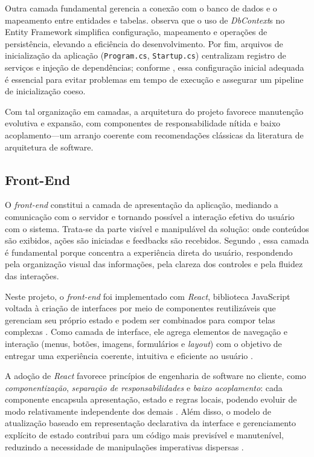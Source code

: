 Outra camada fundamental gerencia a conexão com o banco de dados e o mapeamento entre
entidades e tabelas. \textcite{Lerman2019} observa que o uso de \textit{DbContext}s no
Entity Framework simplifica configuração, mapeamento e operações de persistência, elevando
a eficiência do desenvolvimento. Por fim, arquivos de inicialização da aplicação
(\texttt{Program.cs}, \texttt{Startup.cs}) centralizam registro de serviços e injeção de
dependências; conforme \textcite{Proise2021}, essa configuração inicial adequada é
essencial para evitar problemas em tempo de execução e assegurar um pipeline de
inicialização coeso.

Com tal organização em camadas, a arquitetura do projeto favorece manutenção evolutiva e
expansão, com componentes de responsabilidade nítida e baixo acoplamento—um arranjo
coerente com recomendações clássicas da literatura de arquitetura de software.

\subsection{Front-End}

O \textit{front-end} constitui a camada de apresentação da aplicação, mediando a
comunicação com o servidor e tornando possível a interação efetiva do usuário com o
sistema. Trata-se da parte visível e manipulável da solução: onde conteúdos são
exibidos, ações são iniciadas e feedbacks são recebidos. Segundo \textcite{Meloni2018HTMLCSSJS4e},
essa camada é fundamental porque concentra a experiência direta do usuário, respondendo
pela organização visual das informações, pela clareza dos controles e pela fluidez das
interações.

Neste projeto, o \textit{front-end} foi implementado com \textit{React}, biblioteca
JavaScript voltada à criação de interfaces por meio de componentes reutilizáveis que
gerenciam seu próprio estado e podem ser combinados para compor telas complexas
\parencite{ReactLegacyPTBR2024}. Como camada de interface, ele agrega elementos
de navegação e interação (menus, botões, imagens, formulários e \textit{layout}) com o
objetivo de entregar uma experiência coerente, intuitiva e eficiente ao usuário
\parencite{TOTVS2021}.

A adoção de \textit{React} favorece princípios de engenharia de software no cliente,
como \emph{componentização}, \emph{separação de responsabilidades} e \emph{baixo
	acoplamento}: cada componente encapsula apresentação, estado e regras locais, podendo
evoluir de modo relativamente independente dos demais \parencite{ReactLegacyPTBR2024}.
Além disso, o modelo de atualização baseado em representação declarativa da interface
e gerenciamento explícito de estado contribui para um código mais previsível e
manutenível, reduzindo a necessidade de manipulações imperativas dispersas
\parencite{ReactLegacyPTBR2024}.

